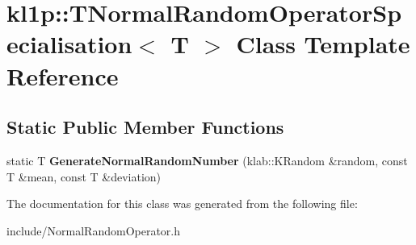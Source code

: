 \hypertarget{classkl1p_1_1TNormalRandomOperatorSpecialisation}{}\section{kl1p\+:\+:T\+Normal\+Random\+Operator\+Specialisation$<$ T $>$ Class Template Reference}
\label{classkl1p_1_1TNormalRandomOperatorSpecialisation}
\subsection*{Static Public Member Functions}
\begin{DoxyCompactItemize}
\item 
static T {\bfseries Generate\+Normal\+Random\+Number} (klab\+::\+K\+Random \&random, const T \&mean, const T \&deviation)\hypertarget{classkl1p_1_1TNormalRandomOperatorSpecialisation_aa0b5d363bb44cfeb140a38246b093dd8}{}\label{classkl1p_1_1TNormalRandomOperatorSpecialisation_aa0b5d363bb44cfeb140a38246b093dd8}

\end{DoxyCompactItemize}


The documentation for this class was generated from the following file\+:\begin{DoxyCompactItemize}
\item 
include/Normal\+Random\+Operator.\+h\end{DoxyCompactItemize}
